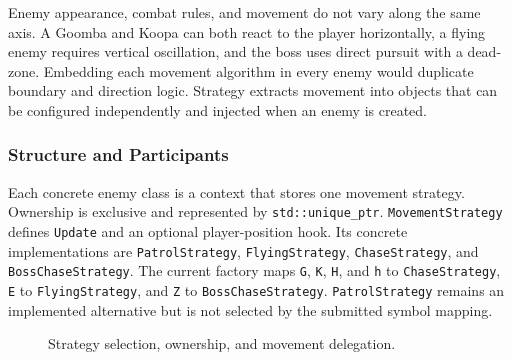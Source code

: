 \documentclass{template}
\begin{document}
Enemy appearance, combat rules, and movement do not vary along the same axis.
A Goomba and Koopa can both react to the player horizontally, a flying enemy
requires vertical oscillation, and the boss uses direct pursuit with a
dead-zone. Embedding each movement algorithm in every enemy would duplicate
boundary and direction logic. Strategy extracts movement into objects that can
be configured independently and injected when an enemy is created.

\subsubsection{Structure and Participants}

Each concrete enemy class is a context that stores one movement strategy.
Ownership is exclusive and represented by \texttt{std::unique\_ptr}.
\texttt{MovementStrategy} defines
\texttt{Update} and an optional player-position hook. Its concrete
implementations are \texttt{PatrolStrategy}, \texttt{FlyingStrategy},
\texttt{ChaseStrategy}, and \texttt{BossChaseStrategy}. The current factory
maps \texttt{G}, \texttt{K}, \texttt{H}, and \texttt{h} to
\texttt{ChaseStrategy}, \texttt{E} to \texttt{FlyingStrategy}, and
\texttt{Z} to \texttt{BossChaseStrategy}. \texttt{PatrolStrategy} remains an
implemented alternative but is not selected by the submitted symbol mapping.

\begin{figure}[H]
    \centering
    \caption{Strategy selection, ownership, and movement delegation.}
    \label{fig:pattern-strategy}
\end{figure}
\end{document}

